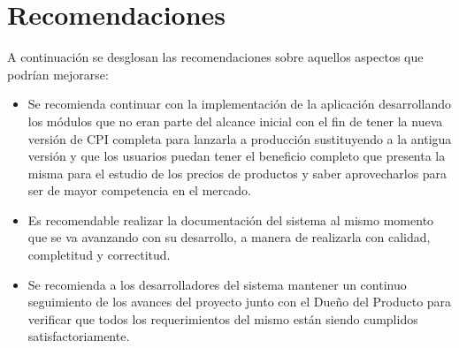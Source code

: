 \section{Recomendaciones}
A continuación se desglosan las recomendaciones sobre aquellos aspectos que podrían mejorarse:
\begin{itemize}
	\item Se recomienda continuar con la implementación de la aplicación desarrollando los módulos que no eran parte del alcance inicial con el fin de tener la nueva versión de CPI completa para lanzarla a producción sustituyendo a la antigua versión y que los usuarios puedan tener el beneficio completo que presenta la misma para el estudio de los precios de productos y saber aprovecharlos para ser de mayor competencia en el mercado.
 	\item Es recomendable realizar la documentación del sistema al mismo momento que se va avanzando con su desarrollo, a manera de realizarla con calidad, completitud y correctitud.
	\item Se recomienda a los desarrolladores del sistema mantener un continuo seguimiento de los avances del proyecto junto con el Dueño del Producto para verificar que todos los requerimientos del mismo están siendo cumplidos satisfactoriamente.
\end{itemize}
